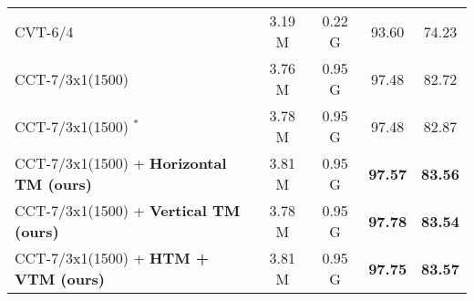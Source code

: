 \documentclass{article}
\begin{document}
\begin{table}[t]
\begin{adjustbox}{width=0.9\textwidth}
\begin{tabular}{l@{\hskip 0.2in} |@{\hskip 0.1in} c c@{\hskip 0.1in} |@{\hskip 0.1in} c@{\hskip 0.1in} c@{\hskip 0.1in}}
        CVT-6/4~\cite{hassani2021escaping} & 3.19 M & 0.22 G & 93.60 & 74.23  \\
        CCT-7/3x1(1500)~\cite{hassani2021escaping}  & 3.76 M & 0.95 G & 97.48 & 82.72 \\
        CCT-7/3x1(1500) $^{*}$  & 3.78 M & 0.95 G & 97.48 & 82.87  \\
        CCT-7/3x1(1500) + \textbf{Horizontal TM (ours)} & 3.81 M  & 0.95 G & \textbf{97.57}  & \textbf{83.56}  \\
        CCT-7/3x1(1500) + \textbf{Vertical TM (ours)} & 3.78 M & 0.95 G & \cellcolor{yellow!25}\textbf{97.78} & \textbf{83.54} \\ 
        CCT-7/3x1(1500) + \textbf{HTM + VTM (ours)} & 3.81 M & 0.95 G & \textbf{97.75} & \cellcolor{yellow!25}\textbf{83.57} \\ 
        \bottomrule
    \end{tabular}
    \end{adjustbox}
    \label{tab:cifar}
\end{table}
\vspace{-4mm}
\end{document}
